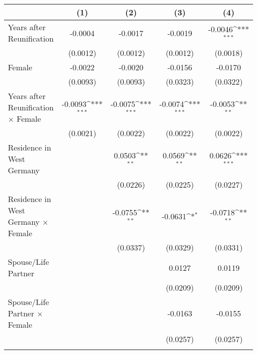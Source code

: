 {
\def\sym#1{\ifmmode^{#1}\else\(^{#1}\)\fi}
\begin{tabular}{l*{4}{c}}
\toprule
                    &\multicolumn{1}{c}{(1)}         &\multicolumn{1}{c}{(2)}         &\multicolumn{1}{c}{(3)}         &\multicolumn{1}{c}{(4)}         \\
\midrule
Years after Reunification&     -0.0004         &     -0.0017         &     -0.0019         &     -0.0046\sym{***}\\
                    &    (0.0012)         &    (0.0012)         &    (0.0012)         &    (0.0018)         \\
\addlinespace
Female              &     -0.0022         &     -0.0020         &     -0.0156         &     -0.0170         \\
                    &    (0.0093)         &    (0.0093)         &    (0.0323)         &    (0.0322)         \\
\addlinespace
Years after Reunification $\times$ Female&     -0.0093\sym{***}&     -0.0075\sym{***}&     -0.0074\sym{***}&     -0.0053\sym{**} \\
                    &    (0.0021)         &    (0.0022)         &    (0.0022)         &    (0.0022)         \\
\addlinespace
Residence in West Germany&                     &      0.0503\sym{**} &      0.0569\sym{**} &      0.0626\sym{***}\\
                    &                     &    (0.0226)         &    (0.0225)         &    (0.0227)         \\
\addlinespace
Residence in West Germany $\times$ Female&                     &     -0.0755\sym{**} &     -0.0631\sym{*}  &     -0.0718\sym{**} \\
                    &                     &    (0.0337)         &    (0.0329)         &    (0.0331)         \\
\addlinespace
Spouse/Life Partner &                     &                     &      0.0127         &      0.0119         \\
                    &                     &                     &    (0.0209)         &    (0.0209)         \\
\addlinespace
Spouse/Life Partner $\times$ Female&                     &                     &     -0.0163         &     -0.0155         \\
                    &                     &                     &    (0.0257)         &    (0.0257)         \\
\addlinespace

\end{tabular}}
